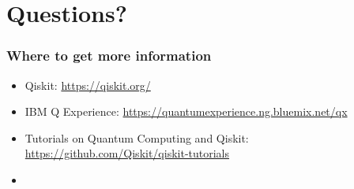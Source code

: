 \documentclass[aspectratio=169,11pt,hyperref={colorlinks=true}]{beamer}
\begin{document}
\section{Questions?}
\begin{frame}
\frametitle{Where to get more information}
    \begin{itemize}
        \item Qiskit: \href{https://qiskit.org/}{https://qiskit.org/}
        \item IBM Q Experience: \href{https://quantumexperience.ng.bluemix.net/qx}{https://quantumexperience.ng.bluemix.net/qx}
        \item Tutorials on Quantum Computing and Qiskit: \href{https://github.com/Qiskit/qiskit-tutorials}{https://github.com/Qiskit/qiskit-tutorials}
        \item 
    \end{itemize}
\end{frame}
\end{document}
